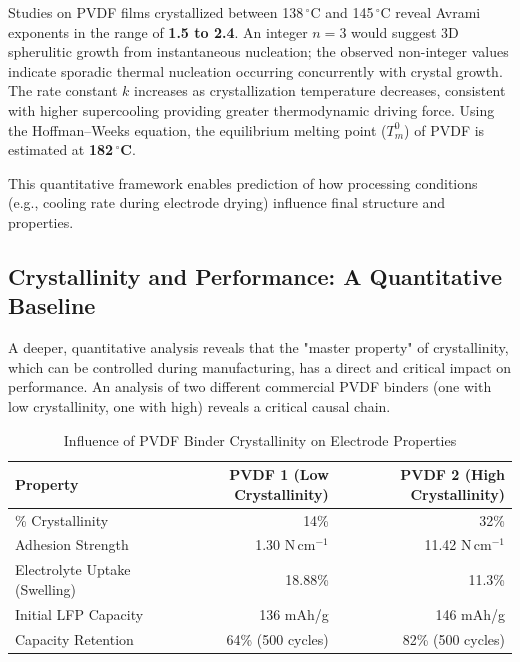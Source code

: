 \documentclass[12pt,a4paper]{article}
\begin{document}
Studies on PVDF films crystallized between 138\,$^{\circ}$C and 145\,$^{\circ}$C reveal Avrami exponents in the range of \textbf{1.5 to 2.4}. An integer $n=3$ would suggest 3D spherulitic growth from instantaneous nucleation; the observed non-integer values indicate sporadic thermal nucleation occurring concurrently with crystal growth. The rate constant $k$ increases as crystallization temperature decreases, consistent with higher supercooling providing greater thermodynamic driving force. Using the Hoffman--Weeks equation, the equilibrium melting point ($T_m^0$) of PVDF is estimated at \textbf{182\,$^{\circ}$C}.\citep{ref39}

This quantitative framework enables prediction of how processing conditions (e.g., cooling rate during electrode drying) influence final structure and properties.

\subsection{Crystallinity and Performance: A Quantitative Baseline}

A deeper, quantitative analysis reveals that the "master property" of crystallinity, which can be controlled during manufacturing, has a direct and critical impact on performance. An analysis of two different commercial PVDF binders (one with low crystallinity, one with high) reveals a critical causal chain.\citep{ref1}

\begin{table}[ht]
  \centering
  \caption{Influence of PVDF Binder Crystallinity on Electrode Properties\citep{ref48}}
  \label{tab:crystallinity}
  \begin{tabular}{lrr}
    \toprule
    Property                      & PVDF 1 (Low Crystallinity) & PVDF 2 (High Crystallinity) \\
    \midrule
    \% Crystallinity              & 14\%                       & 32\%                        \\
    Adhesion Strength             & 1.30 N\,cm$^{-1}$          & 11.42 N\,cm$^{-1}$          \\
    Electrolyte Uptake (Swelling) & 18.88\%                    & 11.3\%                      \\
    Initial LFP Capacity          & 136 mAh/g                  & 146 mAh/g                   \\
    Capacity Retention            & 64\% (500 cycles)          & 82\% (500 cycles)           \\
    \bottomrule
  \end{tabular}
\end{table}
\end{document}
